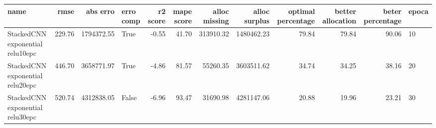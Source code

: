 \begin{tabular}{lrrlrrrrrrrl}
\toprule
name & rmse & abs erro & erro comp & r2 score & mape score & alloc missing & alloc surplus & optimal percentage & better allocation & beter percentage & epoca \\
\midrule
StackedCNN exponential relu10epc & 229.76 & 1794372.55 & True & -0.55 & 41.70 & 313910.32 & 1480462.23 & 79.84 & 79.84 & 90.06 & 10 \\
StackedCNN exponential relu20epc & 446.70 & 3658771.97 & True & -4.86 & 81.57 & 55260.35 & 3603511.62 & 34.74 & 34.25 & 38.16 & 20 \\
StackedCNN exponential relu30epc & 520.74 & 4312838.05 & False & -6.96 & 93.47 & 31690.98 & 4281147.06 & 20.88 & 19.96 & 23.21 & 30 \\
\bottomrule
\end{tabular}
